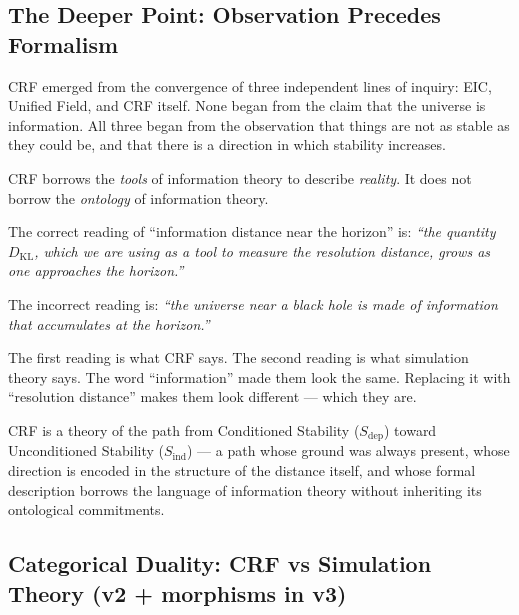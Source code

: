 \documentclass[12pt, a4paper]{article}
\begin{document}
\subsection{The Deeper Point: Observation Precedes Formalism}

CRF emerged from the convergence of three independent lines of
inquiry: EIC, Unified Field, and CRF itself. None began from the
claim that the universe is information. All three began from the
observation that things are not as stable as they could be, and
that there is a direction in which stability increases.

\begin{derivedbox}[title={FIND-RN02: The direction of the
borrowing in CRF}]
CRF borrows the \emph{tools} of information theory to describe
\emph{reality}. It does not borrow the \emph{ontology} of
information theory.

\medskip
The correct reading of ``information distance near the horizon''
is: \textit{``the quantity $D_{\mathrm{KL}}$, which we are using
as a tool to measure the resolution distance, grows as one
approaches the horizon.''}

\medskip
The incorrect reading is: \textit{``the universe near a black
hole is made of information that accumulates at the horizon.''}

\medskip
The first reading is what CRF says.
The second reading is what simulation theory says.
The word ``information'' made them look the same.
Replacing it with ``resolution distance'' makes them look
different --- which they are.
\end{derivedbox}

\bigskip
CRF is a theory of the path from Conditioned Stability
($S_{\mathrm{dep}}$) toward Unconditioned Stability
($S_{\mathrm{ind}}$) --- a path whose ground was always present,
whose direction is encoded in the structure of the distance itself,
and whose formal description borrows the language of information
theory without inheriting its ontological commitments.

\appendix

\subsection{Categorical Duality: CRF vs Simulation Theory
(v2 + morphisms in v3)}
\label{app:categorical}
\end{document}
